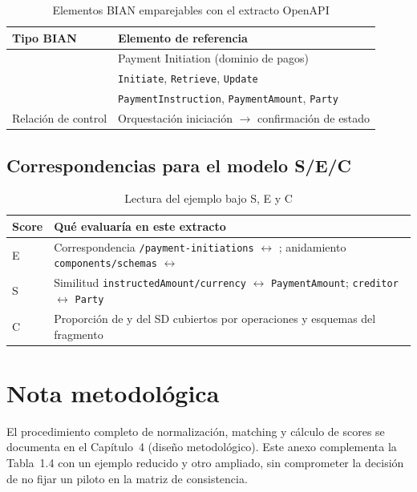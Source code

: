 \begin{table}[H]
  \centering
  \caption{Elementos BIAN emparejables con el extracto OpenAPI}
  \label{tab:anexo-f-bian}
  \small
  \begin{tabular}{@{}p{}p{}@{}}
    \toprule
    \textbf{Tipo BIAN} & \textbf{Elemento de referencia} \\
    \midrule
    \ServiceDomain{} & Payment Initiation (dominio de pagos) \\
    \Behavior{} & \texttt{Initiate}, \texttt{Retrieve}, \texttt{Update} \\
    \BusinessObject{} & \texttt{PaymentInstruction}, \texttt{PaymentAmount}, \texttt{Party} \\
    Relación de control & Orquestación iniciación $\rightarrow$ confirmación de estado \\
    \bottomrule
  \end{tabular}
\end{table}

\subsection{Correspondencias para el modelo S/E/C}

\begin{table}[H]
  \centering
  \caption{Lectura del ejemplo bajo S, E y C}
  \label{tab:anexo-f-scores}
  \small
  \begin{tabular}{@{}p{}p{}@{}}
    \toprule
    \textbf{Score} & \textbf{Qué evaluaría en este extracto} \\
    \midrule
    E &
    Correspondencia \texttt{/payment-initiations} $\leftrightarrow$ \Behavior{};
    anidamiento \texttt{components/schemas} $\leftrightarrow$ \BusinessObject{} \\
    S &
    Similitud \texttt{instructedAmount/currency} $\leftrightarrow$ \texttt{PaymentAmount};
    \texttt{creditor} $\leftrightarrow$ \texttt{Party} \\
    C &
    Proporción de \Behavior{} y \BusinessObject{} del SD cubiertos por operaciones y esquemas
    del fragmento \\
    \bottomrule
  \end{tabular}
\end{table}

\section{Nota metodológica}

El procedimiento completo de normalización, matching y cálculo de scores se documenta en el
Capítulo~4 (diseño metodológico). Este anexo complementa la Tabla~1.4 con un ejemplo reducido y
otro ampliado, sin comprometer la decisión de no fijar un piloto en la matriz de consistencia.
